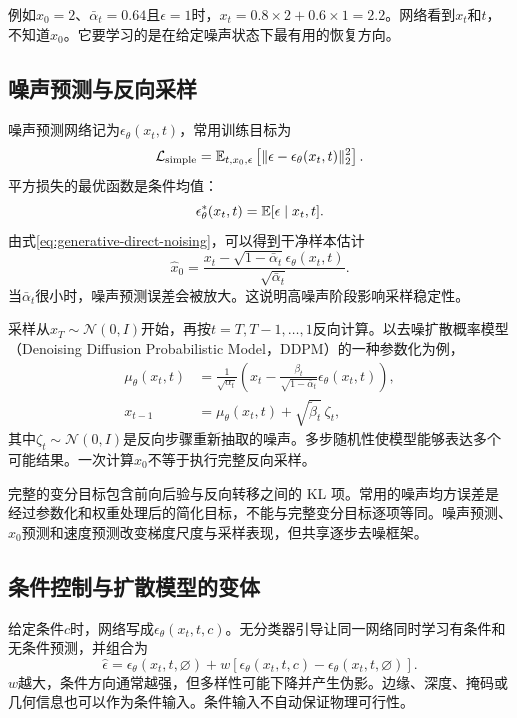 例如$x_0=2$、$\bar\alpha_t=0.64$且$\epsilon=1$时，$x_t=0.8\times2+0.6\times1=2.2$。网络看到$x_t$和$t$，不知道$x_0$。它要学习的是在给定噪声状态下最有用的恢复方向。

\subsection{噪声预测与反向采样}

噪声预测网络记为$\epsilon_{\theta}(x_t,t)$，常用训练目标为
\begin{equation}
\mathcal L_{\mathrm{simple}}=\mathbb{E}_{t,x_0,\epsilon}\left[\|\epsilon-\epsilon_{\theta}(x_t,t)\|_2^2\right].
\end{equation}
平方损失的最优函数是条件均值：
\[
\epsilon_{\theta}^*(x_t,t)=\mathbb{E}[\epsilon\mid x_t,t].
\]
由式\eqref{eq:generative-direct-noising}，可以得到干净样本估计
\[
\widehat x_0=\frac{x_t-\sqrt{1-\bar\alpha_t}\epsilon_{\theta}(x_t,t)}{\sqrt{\bar\alpha_t}}.
\]
当$\bar\alpha_t$很小时，噪声预测误差会被放大。这说明高噪声阶段影响采样稳定性。

采样从$x_T\sim\mathcal N(0,I)$开始，再按$t=T,T-1,\ldots,1$反向计算。以去噪扩散概率模型（Denoising Diffusion Probabilistic Model，DDPM）的一种参数化为例，
\begin{align}
\mu_{\theta}(x_t,t)&=\frac1{\sqrt{\alpha_t}}
\left(x_t-\frac{\beta_t}{\sqrt{1-\bar\alpha_t}}\epsilon_{\theta}(x_t,t)\right),\\
x_{t-1}&=\mu_{\theta}(x_t,t)+\sqrt{\widetilde\beta_t}\,\zeta_t,
\end{align}
其中$\zeta_t\sim\mathcal N(0,I)$是反向步骤重新抽取的噪声。多步随机性使模型能够表达多个可能结果。一次计算$\widehat x_0$不等于执行完整反向采样。

完整的变分目标包含前向后验与反向转移之间的 KL 项。常用的噪声均方误差是经过参数化和权重处理后的简化目标，不能与完整变分目标逐项等同。噪声预测、$x_0$预测和速度预测改变梯度尺度与采样表现，但共享逐步去噪框架。

\subsection{条件控制与扩散模型的变体}

给定条件$c$时，网络写成$\epsilon_{\theta}(x_t,t,c)$。无分类器引导让同一网络同时学习有条件和无条件预测，并组合为
\begin{equation}
\widehat\epsilon=\epsilon_{\theta}(x_t,t,\varnothing)+w\left[\epsilon_{\theta}(x_t,t,c)-\epsilon_{\theta}(x_t,t,\varnothing)\right].
\end{equation}
$w$越大，条件方向通常越强，但多样性可能下降并产生伪影。边缘、深度、掩码或几何信息也可以作为条件输入。条件输入不自动保证物理可行性。

